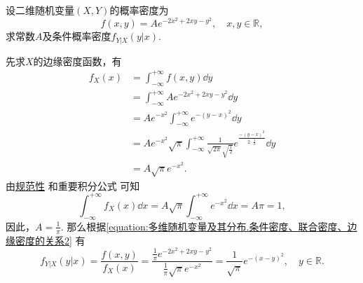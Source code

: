 \begin{example}
设二维随机变量\((X,Y)\)的概率密度为\begin{equation*}
	f(x,y) = A e^{-2x^2+2xy-y^2}, \quad x,y\in\mathbb{R},
\end{equation*}
求常数\(A\)及条件概率密度\(f_{Y \vert X}(y \vert x)\).
\begin{solution}
先求\(X\)的边缘密度函数，有\begin{align*}
	f_X(x) &= \int_{-\infty}^{+\infty} f(x,y) \dd{y} \\
	&= \int_{-\infty}^{+\infty} A e^{-2x^2+2xy-y^2} \dd{y} \\
	&= A e^{-x^2} \int_{-\infty}^{+\infty} e^{-(y-x)^2} \dd{y} \\
	&= A e^{-x^2} \sqrt{\pi} \int_{-\infty}^{+\infty}
		\frac{1}{\sqrt{2\pi} \sqrt{\frac{1}{2}}}
		e^{\frac{-(y-x)^2}{2 \cdot \frac{1}{2}}} \dd{y} \\
	&= A \sqrt{\pi} e^{-x^2}.
\end{align*}
由\hyperref[theorem:随机变量及其分布.连续型随机变量的密度函数的性质]{规范性}%
和重要积分公式  可知\begin{equation*}
	\int_{-\infty}^{+\infty} f_X(x) \dd{x}
	= A \sqrt{\pi} \int_{-\infty}^{+\infty} e^{-x^2} \dd{x}
	= A \pi = 1,
\end{equation*}
因此，\(A = \frac{1}{\pi}\).
那么根据\cref{equation:多维随机变量及其分布.条件密度、联合密度、边缘密度的关系2} 有\begin{equation*}
	f_{Y \vert X}(y \vert x)
	= \frac{f(x,y)}{f_X(x)}
	= \frac{\frac{1}{\pi} e^{-2x^2+2xy-y^2}}{\frac{1}{\pi} \sqrt{\pi} e^{-x^2}}
	= \frac{1}{\sqrt{\pi}} e^{-(x-y)^2},
	\quad y\in\mathbb{R}.
\end{equation*}
\end{solution}
\end{example}
